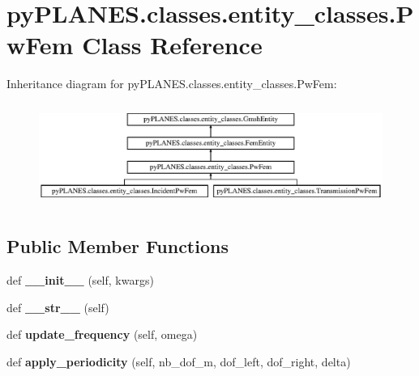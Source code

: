 \hypertarget{classpy_p_l_a_n_e_s_1_1classes_1_1entity__classes_1_1_pw_fem}{}\section{py\+P\+L\+A\+N\+E\+S.\+classes.\+entity\+\_\+classes.\+Pw\+Fem Class Reference}
\label{classpy_p_l_a_n_e_s_1_1classes_1_1entity__classes_1_1_pw_fem}
Inheritance diagram for py\+P\+L\+A\+N\+E\+S.\+classes.\+entity\+\_\+classes.\+Pw\+Fem\+:\begin{figure}[H]
\begin{center}
\leavevmode
\includegraphics[height=3.393939cm]{classpy_p_l_a_n_e_s_1_1classes_1_1entity__classes_1_1_pw_fem}
\end{center}
\end{figure}
\subsection*{Public Member Functions}
\begin{DoxyCompactItemize}
\item 
\mbox{\label{classpy_p_l_a_n_e_s_1_1classes_1_1entity__classes_1_1_pw_fem_a74e5ff97dc6fe487b32498fe214cf70d}} 
def {\bfseries \+\_\+\+\_\+init\+\_\+\+\_\+} (self, kwargs)
\item 
\mbox{\label{classpy_p_l_a_n_e_s_1_1classes_1_1entity__classes_1_1_pw_fem_abcb4803ace9bd20f95b7c77ad3a76fbf}} 
def {\bfseries \+\_\+\+\_\+str\+\_\+\+\_\+} (self)
\item 
\mbox{\label{classpy_p_l_a_n_e_s_1_1classes_1_1entity__classes_1_1_pw_fem_a075b70fe21e012b5b04f63f19afd241b}} 
def {\bfseries update\+\_\+frequency} (self, omega)
\item 
\mbox{\label{classpy_p_l_a_n_e_s_1_1classes_1_1entity__classes_1_1_pw_fem_a26bd15bed479ab3485c5a8d0185382c2}} 
def {\bfseries apply\+\_\+periodicity} (self, nb\+\_\+dof\+\_\+m, dof\+\_\+left, dof\+\_\+right, delta)
\end{DoxyCompactItemize}
